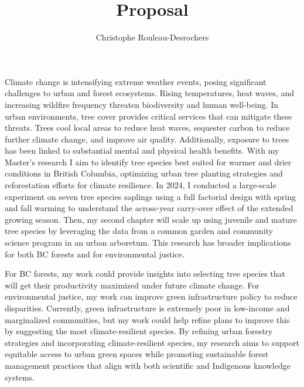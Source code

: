 \documentclass[11pt,letter]{article}
\title{Proposal}
\author{Christophe Rouleau-Desrochers}
\begin{document}

\maketitle

Climate change is intensifying extreme weather events, posing significant challenges to urban and forest ecosystems. Rising temperatures, heat waves, and increasing wildfire frequency threaten biodiversity and human well-being. In urban environments, tree cover provides critical services that can mitigate these threats. Trees cool local areas to reduce heat waves, sequester carbon to reduce further climate change, and improve air quality. Additionally, exposure to trees has been linked to substantial mental and physical health benefits. With my Master's research I aim to identify tree species best suited for warmer and drier conditions in British Columbia, optimizing urban tree planting strategies and reforestation efforts for climate resilience.
In 2024, I conducted a large-scale experiment on seven tree species saplings using a full factorial design with spring and fall warming to understand the across-year carry-over effect of the extended growing season. Then, my second chapter will scale up using juvenile and mature tree species by leveraging the data from a common garden and community science program in an urban arboretum.
This research has broader implications for both BC forests and for environmental justice. 


For BC forests, my work could provide insights into selecting tree species that will get their productivity maximized under future climate change. For environmental justice, my work can improve green infrastructure policy to reduce disparities. Currently, green infrastructure is extremely poor in low-income and marginalized communities, but my work could help refine plans to improve this by suggesting the most climate-resilient species. By refining urban forestry strategies and incorporating climate-resilient species, my research aims to support equitable access to urban green spaces while promoting sustainable forest management practices that align with both scientific and Indigenous knowledge systems.
\end{document}
